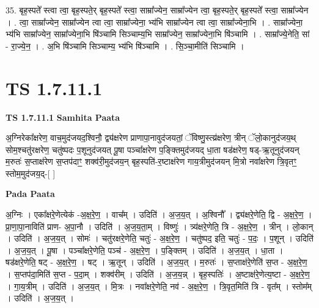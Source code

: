 \documentclass[17pt]{extarticle}
\begin{document}
35. बृह॒स्पते᳚ स्त्वा त्वा॒ बृह॒स्पते॒र् बृह॒स्पते᳚ स्त्वा॒ साम्रा᳚ज्येन॒ साम्रा᳚ज्येन त्वा॒ बृह॒स्पते॒र् बृह॒स्पते᳚ स्त्वा॒ साम्रा᳚ज्येन । . त्वा॒ साम्रा᳚ज्येन॒ साम्रा᳚ज्येन त्वा त्वा॒ साम्रा᳚ज्येना॒ भ्य॑भि साम्रा᳚ज्येन त्वा त्वा॒ साम्रा᳚ज्येना॒भि । . साम्रा᳚ज्येना॒ भ्य॑भि साम्रा᳚ज्येन॒ साम्रा᳚ज्येना॒भि षि॑ञ्चामि सिञ्चाम्य॒भि साम्रा᳚ज्येन॒ साम्रा᳚ज्येना॒भि षि॑ञ्चामि । . साम्रा᳚ज्ये॒नेति॒ सां - रा॒ज्ये॒न॒ । . अ॒भि षि॑ञ्चामि सिञ्चाम्य॒ भ्य॑भि षि॑ञ्चामि । . सि॒ञ्चा॒मीति॑ सिञ्चामि । \newline
\pagebreak
{}
\section*{ TS 1.7.11.1 }

\textbf{TS 1.7.11.1 } \newline
\textbf{Samhita Paata} \newline

अ॒ग्निरेका᳚क्षरेण॒ वाच॒मुद॑जयद॒श्विनौ॒ द्व्य॑क्षरेण प्राणापा॒नावुद॑जयतां॒ ॅविष्णु॒स्त्य्र॑क्षरेण॒ त्रीन् ॅलो॒कानुद॑जय॒थ् सोम॒श्चतु॑रक्षरेण॒ चतु॑ष्पदः प॒शूनुद॑जयत् पू॒षा पञ्चा᳚क्षरेण प॒ङ्क्तिमुद॑जयद् धा॒ता षड॑क्षरेण॒ षड्-ऋ॒तूनुद॑जयन् म॒रुतः॑ स॒प्ताक्ष॑रेण स॒प्तप॑दाꣳ॒॒ शक्व॑री॒मुद॑जय॒न् बृह॒स्पति॑-र॒ष्टाक्ष॑रेण गाय॒त्रीमुद॑जयन् मि॒त्रो नवा᳚क्षरेण त्रि॒वृतꣳ॒॒ स्तोम॒मुद॑जय॒द्-[ ] \newline

\textbf{Pada Paata} \newline

अ॒ग्निः । एका᳚क्षरे॒णेत्येक॑ -अ॒क्ष॒रे॒ण॒ । वाच᳚म् । उदिति॑ । अ॒ज॒य॒त् । अ॒श्विनौ᳚ । द्व्य॑क्षरे॒णेति॒ द्वि - अ॒क्ष॒रे॒ण॒ । प्रा॒णा॒पा॒नाविति॑ प्राण- अ॒पा॒नौ । उदिति॑ । अ॒ज॒य॒ता॒म् । विष्णुः॑ । त्र्य॑क्षरे॒णेति॒ त्रि - अ॒क्ष॒रे॒ण॒ । त्रीन् । लो॒कान् । उदिति॑ । अ॒ज॒य॒त् । सोमः॑ । चतु॑रक्षरे॒णेति॒ चतुः॑ - अ॒क्ष॒रे॒ण॒ । चतु॑ष्पद॒ इति॒ चतुः॑ - प॒दः॒ । प॒शून् । उदिति॑ । अ॒ज॒य॒त् । पू॒षा । पञ्चा᳚क्षरे॒णेति॒ पञ्च॑ - अ॒क्ष॒रे॒ण॒ । प॒ङ्क्तिम् । उदिति॑ । अ॒ज॒य॒त् । धा॒ता । षड॑क्षरे॒णेति॒ षट् - अ॒क्ष॒रे॒ण॒ । षट् । ऋ॒तून् । उदिति॑ । अ॒ज॒य॒त् । म॒रुतः॑ । स॒प्ताक्ष॑रे॒णेति॑ स॒प्त - अ॒क्ष॒रे॒ण॒ । स॒प्तप॑दा॒मिति॑ स॒प्त - प॒दा॒म् । शक्व॑रीम् । उदिति॑ । अ॒ज॒य॒न्न् । बृह॒स्पतिः॑ । अ॒ष्टाक्ष॑रे॒णेत्य॒ष्टा - अ॒क्ष॒रे॒ण॒ । गा॒य॒त्रीम् । उदिति॑ । अ॒ज॒य॒त् । मि॒त्रः । नवा᳚क्षरे॒णेति॒ नव॑ - अ॒क्ष॒रे॒ण॒ । त्रि॒वृत॒मिति॑ त्रि - वृत᳚म् । स्तोम᳚म् । उदिति॑ । अ॒ज॒य॒त् ।  \newline
\end{document}
